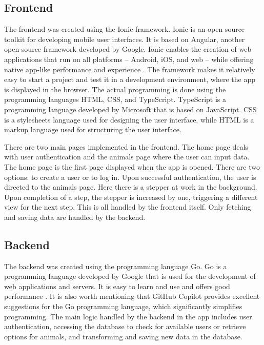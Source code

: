 \documentclass{josis}
\begin{document}
\subsection{Frontend}

The frontend was created using the Ionic framework. Ionic is an open-source toolkit for 
developing mobile user interfaces. It is based on Angular, another open-source framework developed by Google. 
Ionic enables the creation of web applications that run on all platforms -- Android, iOS, and web -- while 
offering native app-like performance and experience \cite{IonicFrameworkCrossPlatform}.
The framework makes it relatively easy to start a project and test it in a development environment, 
where the app is displayed in the browser. The actual programming is done using the programming 
languages HTML, CSS, and TypeScript. TypeScript is a programming language developed by Microsoft that is based on JavaScript. 
CSS is a stylesheets language used for designing the user interface, while HTML is a markup language used for structuring the user interface.

There are two main pages implemented in the frontend. The home page deals with user authentication and 
the animals page where the user can input data. The home page is the first page displayed when the app is opened.
There are two options: to create a user or to log in. Upon successful authentication, the user is directed to the
animals page. Here there is a stepper at work in the background. Upon completion of a step, the stepper is increased
by one, triggering a different view for the next step. This is all handled by the frontend itself. Only fetching and saving
data are handled by the backend.

\subsection{Backend}

The backend was created using the programming language Go. Go is a programming language developed 
by Google that is used for the development of web applications and servers. 
It is easy to learn and use and offers good performance \cite{GoProgrammingLanguage}.
It is also worth mentioning that GitHub Copilot provides excellent suggestions for 
the Go programming language, which significantly simplifies programming. The main logic handled 
by the backend in the app includes user authentication, accessing the database to check for available 
users or retrieve options for animals, and transforming and saving new data in the database.
\end{document}

